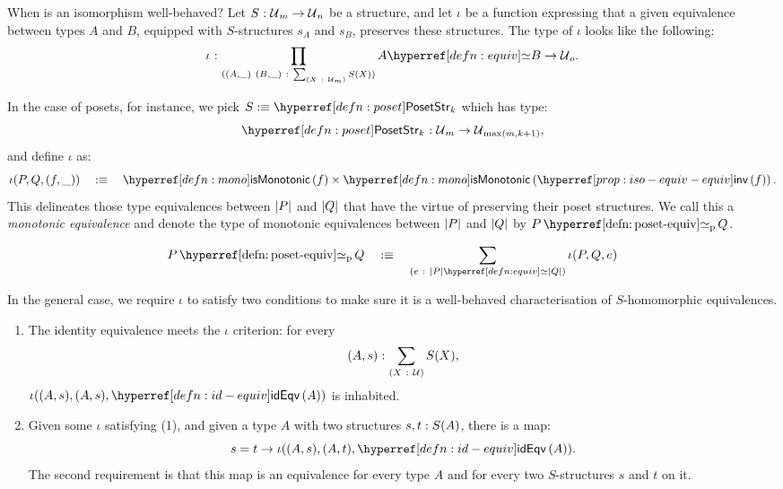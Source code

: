 When is an isomorphism well-behaved? Let $S\hspace{0.1mm}:\hspace{0.1mm}\mathcal{U}{}_m \rightarrow \mathcal{U}{}_n$ be a
structure, and let $\iota$ be a function expressing that a given equivalence between types $A$
and $B$, equipped with $S$-structures $s_A$ and $s_B$, preserves these structures. The
type of $\iota$ looks like the following:
\begin{equation*}
  \oftyI{\iota}{%
    \pity{(A , \_)~(B , \_)}{\sigmaty{X}{\univ{}_m}{S(X)}}{%
      \typequiv{A}{B} \rightarrow \univ{}_o
    }
  }.
\end{equation*}

In the case of posets, for instance, we pick $S \is \posetstrnm{}_k$ which has type:
\begin{equation*}
  \oftyI{\posetstrnm{}_k}{\univ{}_m \rightarrow \univ{}_{\max(m, k+1)}},
\end{equation*}
and define $\iota$ as:
\begin{equation*}
  \iota(P, Q, (f , \_)) \quad\is\quad \ismonotonic{f} \times \ismonotonic{\invequiv{f}}  .
\end{equation*}
This delineates those type equivalences between $\left| P \right|$ and $\left| Q \right|$ that have the
virtue of preserving their poset structures. We call this a \emph{monotonic equivalence}
and denote the type of monotonic equivalences between $\left| P \right|$ and $\left| Q \right|$ by
$\posetequiv{P}{Q}$.
\begin{defn}\label{defn:poset-equiv}
  \begin{equation*}
    \posetequiv{P}{Q} \quad\is\quad \sigmaty{e}{\typequiv{\abs{P}}{\abs{Q}}}{\iota(P, Q, e)}
  \end{equation*}
\end{defn}

In the general case, we require $\iota$ to satisfy two conditions to make sure it is a
well-behaved characterisation of $S$-homomorphic equivalences.
\begin{enumerate}
  \item The identity equivalence meets the $\iota$ criterion: for every $$(A,
    s)\hspace{0.1mm}:\hspace{0.1mm}\sum_{(X~:~\mathcal{U}{})} S(X),$$ $\iota((A, s), (A, s), \idequiv{A})$ is inhabited.
  \item Given some $\iota$ satisfying (1), and given a type $A$ with two structures
    $s, t:S(A)$, there is a map:
    \begin{equation*}
      s = t \rightarrow \iota((A, s), (A, t), \idequiv{A}).
    \end{equation*}
    The second requirement is that this map is an equivalence for every type $A$ and for
    every two $S$-structures $s$ and $t$ on it.
\end{enumerate}

